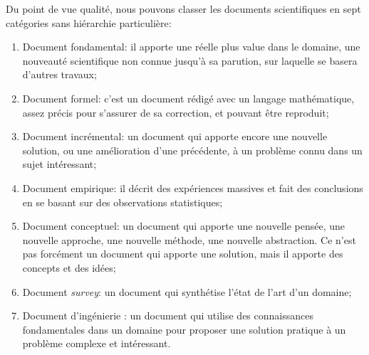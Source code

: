 \documentclass{rapport}
\begin{document}
      Du point de vue qualité, nous pouvons classer les documents scientifiques en sept catégories sans hiérarchie particulière:
      \begin{enumerate}
        \item  Document fondamental: il apporte une réelle plus value dans le domaine, une nouveauté scientifique non connue jusqu'à sa parution, sur laquelle se basera d'autres travaux;
        \item  Document formel: c'est un document rédigé avec un langage mathématique, assez précis pour s'assurer de sa correction, et pouvant être reproduit;
        \item  Document incrémental: un  document qui apporte encore une nouvelle solution, ou une amélioration d'une précédente, à un problème connu dans un sujet intéressant;
        \item  Document empirique: il décrit des expériences massives et fait des conclusions en se basant sur des observations statistiques;
        \item  Document conceptuel: un document qui apporte une nouvelle pensée, une nouvelle approche, une nouvelle méthode, une nouvelle abstraction. Ce n'est pas forcément un document qui apporte une solution, mais il apporte des concepts et des idées;
        \item Document {\it survey}: un document qui synthétise l'état de l'art d'un domaine;
        \item Document d'ingénierie : un document qui utilise des connaissances fondamentales dans un domaine pour proposer une solution pratique à un problème complexe et intéressant.
      \end{enumerate}
        
  \pageblanche
  
  
\end{document}
